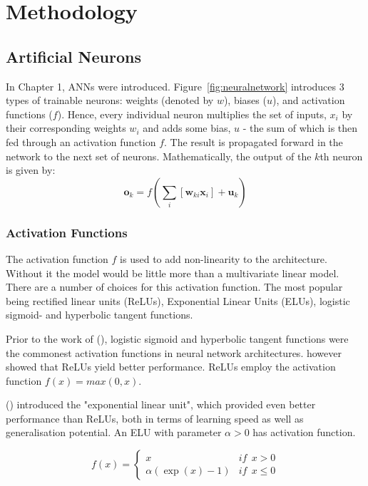 \documentclass[11pt,oneside,openany,a4paper,english, report, goldenblock
]{usthesis}
\begin{document}
\chapter{Methodology}

\section{Artificial Neurons}

In Chapter 1, ANNs were introduced. Figure~\ref{fig:neuralnetwork} introduces 3 types of trainable neurons: weights (denoted by $w$), biases ($u$), and activation functions ($f$). Hence, every individual neuron multiplies the set of inputs, $x_i$ by their corresponding weights $w_i$ and adds some bias, $u$ - the sum of which is then fed through an activation function $f$. The result is propagated forward in the network to the next set of neurons. Mathematically, the output of the $k$th neuron is given by:
\begin{equation}
\mathbf{o}_k = f\left(\sum_i \left[ \mathbf{w}_{ki} \mathbf{x}_i \right] + \mathbf{u}_k\right)
\end{equation}

\subsection{Activation Functions}
The activation function $f$ is used to add non-linearity to the architecture. Without it the model would be little more than a multivariate linear model. There are a number of choices for this activation function. The most popular being rectified linear units (ReLUs), Exponential Linear Units (ELUs), logistic sigmoid- and hyperbolic tangent functions.

Prior to the work of  (\citeyear{glorot2011deep}), logistic sigmoid and hyperbolic tangent functions were the commonest activation functions in neural network architectures. \citet{glorot2011deep} however showed that ReLUs yield better performance. ReLUs employ the activation function $f\left(x\right) = max\left(0, x\right)$.

 (\citeyear{DBLP:journals/corr/ClevertUH15}) introduced the "exponential linear unit", which provided even better performance than ReLUs, both in terms of learning speed as well as generalisation potential. An ELU with parameter $\alpha > 0$ has activation function.

\begin{equation}
f\left(x\right)=\left\{\begin{matrix}
x & if\ \ x > 0\\ 
\alpha \left( \exp\left(x \right ) -1\right ) & if\ \ x \leq 0
\end{matrix}\right.
\end{equation}
\end{document}
